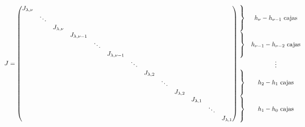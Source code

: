 \[
J = \begin{pmatrix}
    \begin{matrix} J_{\lambda,\nu} \\ & \ddots \\ & & J_{\lambda,\nu} \end{matrix} & & & & \\
    & \begin{matrix} J_{\lambda,\nu-1} \\ & \ddots \\ & & J_{\lambda,\nu-1} \end{matrix} & & & \\
    & & \ddots & & \\
    & & & \begin{matrix} J_{\lambda,2} \\ & \ddots \\ & & J_{\lambda,2} \end{matrix} & \\
    & & & & \begin{matrix} J_{\lambda,1} \\ & \ddots \\ & & J_{\lambda,1} \end{matrix}
\end{pmatrix}
\begin{matrix}
    \left.\begin{matrix} \vphantom{J_{\lambda,\nu}} \\ \vphantom{\ddots} \\ \vphantom{J_{\lambda,\nu}} \end{matrix}\right\} & h_\nu - h_{\nu-1} \text{ cajas} \\
    \left.\begin{matrix} \vphantom{J_{\lambda,\nu-1}} \\ \vphantom{\ddots} \\ \vphantom{J_{\lambda,\nu-1}} \end{matrix}\right\} & h_{\nu-1} - h_{\nu-2} \text{ cajas} \\
    \vphantom{\ddots} & \vdots \\
    \left.\begin{matrix} \vphantom{J_{\lambda,2}} \\ \vphantom{\ddots} \\ \vphantom{J_{\lambda,2}} \end{matrix}\right\} & h_2 - h_1 \text{ cajas} \\
    \left.\begin{matrix} \vphantom{J_{\lambda,1}} \\ \vphantom{\ddots} \\ \vphantom{J_{\lambda,1}} \end{matrix}\right\} & h_1 - h_0 \text{ cajas}
\end{matrix}
\]

